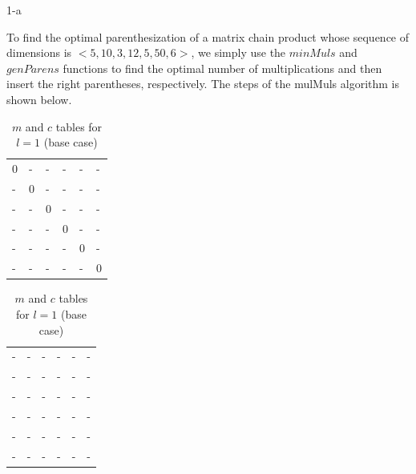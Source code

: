 \documentclass[11pt]{article}
\begin{document}

\begin{prob}{1-a}
\end{prob}
\begin{sol}

To find the optimal parenthesization of a matrix chain product whose sequence of dimensions is $<5, 10, 3, 12, 5, 50, 6>$, we simply use the $minMuls$ and $genParens$ functions to find the optimal number of multiplications and then insert the right parentheses, respectively. The steps of the mulMuls algorithm is shown below.

\begin{table}[htbp]
	\centering
	\begin{tabular}{|l|l|l|l|l|l|}
		 \hline
        0 & - & - & - & - & - \\ 
        - & 0 & - & - & - & - \\ 
        - & - & 0 & - & - & - \\ 
        - & - & - & 0 & - & - \\ 
        - & - & - & - & 0 & - \\ 
        - & - & - & - & - & 0 \\
        \hline
	\end{tabular}
	\hspace{20mm}
	\begin{tabular}{|l|l|l|l|l|l|}
		 \hline
        - & - & - & - & - & - \\ 
        - & - & - & - & - & - \\ 
        - & - & - & - & - & - \\ 
        - & - & - & - & - & - \\ 
        - & - & - & - & - & - \\ 
        - & - & - & - & - & - \\
        \hline
	\end{tabular}
	\caption{$m$ and $c$ tables for $l = 1$ (base case)}
\end{table}


\end{sol}
\end{document}
